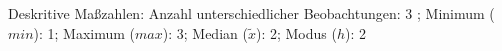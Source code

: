 				\label{tableValues:aocc03}
				\vspace*{-\baselineskip}
                    \begin{noten}
                	    \note{} Deskritive Maßzahlen:
                	    Anzahl unterschiedlicher Beobachtungen: 3%
                	    ; 
                	      Minimum ($min$): 1; 
                	      Maximum ($max$): 3; 
                	      Median ($\tilde{x}$): 2; 
                	      Modus ($h$): 2
                     \end{noten}


